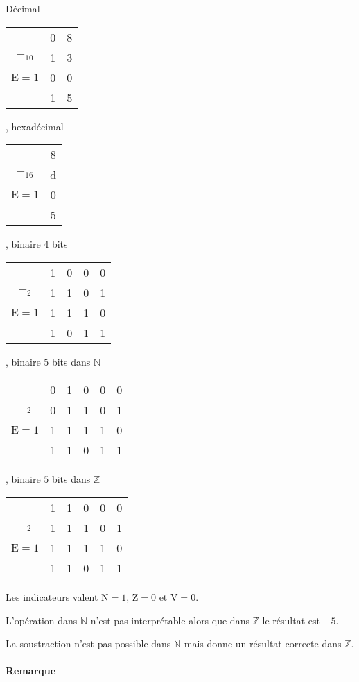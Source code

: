 \documentclass[french, 12pt, a4paper]{article}
\begin{document}
Décimal
\begin{tabular}[c]{ccc}
					& 0 & 8	\\
$-_{10}$			& 1 & 3 \\
$\mathrm{E} = 1$	& 0 & 0 \\	\cline{2-3}
					& 1 & 5 \\
\end{tabular}
, hexadécimal
\begin{tabular}[c]{cc}
					& 8	\\
$-_{16}$			& d \\
$\mathrm{E} = 1$	& 0 \\	\cline{2-2}
					& 5 \\
\end{tabular}
, binaire $4$ bits
\begin{tabular}[c]{ccccc}
					& 1 & 0 & 0 & 0	\\
$-_2$				& 1 & 1 & 0 & 1 \\
$\mathrm{E} = 1$ 	& 1 & 1 & 1 & 0 \\	\cline{2-5}
					& 1 & 0 & 1 & 1 \\
\end{tabular}
, binaire $5$ bits dans $\mathbb{N}$
\begin{tabular}[c]{cccccc}
					& 0 & 1 & 0 & 0 & 0	\\
$-_2$				& 0 & 1 & 1 & 0 & 1 \\
$\mathrm{E} = 1$ 	& 1 & 1 & 1 & 1 & 0 \\	\cline{2-6}
					& 1 & 1 & 0 & 1 & 1 \\
\end{tabular}
, binaire $5$ bits dans $\mathbb{Z}$
\begin{tabular}[c]{cccccc}
					& 1 & 1 & 0 & 0 & 0	\\
$-_2$				& 1 & 1 & 1 & 0 & 1 \\
$\mathrm{E} = 1$ 	& 1 & 1 & 1 & 1 & 0 \\	\cline{2-6}
					& 1 & 1 & 0 & 1 & 1 \\
\end{tabular}

Les indicateurs valent $\mathrm{N} = 1$, $\mathrm{Z} = 0$ et $\mathrm{V} = 0$.

L'opération dans $\mathbb{N}$ n'est pas interprétable alors que dans $\mathbb{Z}$ le résultat est $-5$.

La soustraction n'est pas possible dans $\mathbb{N}$ mais donne un résultat correcte dans $\mathbb{Z}$.

\paragraph{Remarque}
\end{document}
